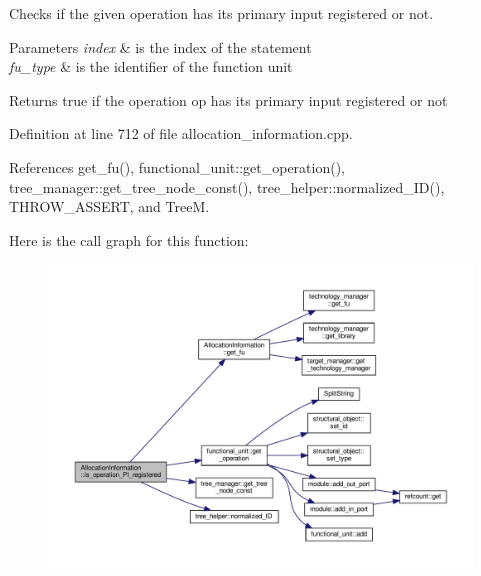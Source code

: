 Checks if the given operation has its primary input registered or not. 


\begin{DoxyParams}{Parameters}
{\em index} & is the index of the statement \\
\hline
{\em fu\+\_\+type} & is the identifier of the function unit \\
\hline
\end{DoxyParams}
\begin{DoxyReturn}{Returns}
true if the operation op has its primary input registered or not 
\end{DoxyReturn}


Definition at line 712 of file allocation\+\_\+information.\+cpp.



References get\+\_\+fu(), functional\+\_\+unit\+::get\+\_\+operation(), tree\+\_\+manager\+::get\+\_\+tree\+\_\+node\+\_\+const(), tree\+\_\+helper\+::normalized\+\_\+\+I\+D(), T\+H\+R\+O\+W\+\_\+\+A\+S\+S\+E\+RT, and TreeM.

Here is the call graph for this function\+:
\nopagebreak
\begin{figure}[H]
\begin{center}
\leavevmode
\includegraphics[width=350pt]{d7/d79/classAllocationInformation_a2e448da646b4b29ad72f75c75fdf04b2_cgraph}
\end{center}
\end{figure}
\mbox{\label{classAllocationInformation_a5b773433e8ccb2c3517df0b7cec41f26}} 
